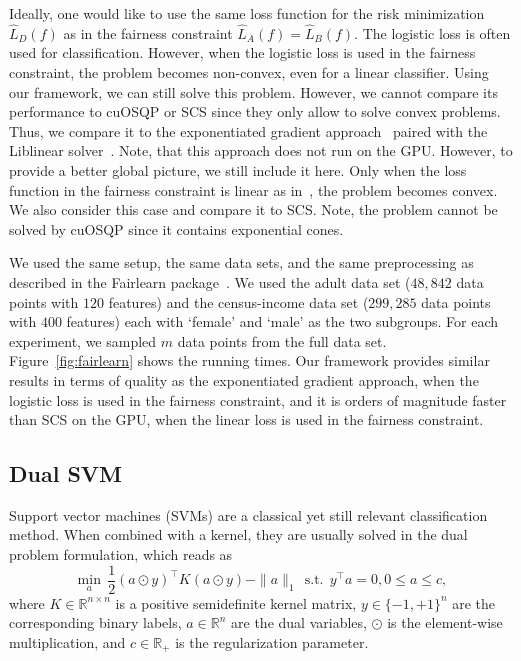 \documentclass[letterpaper]{article} %
\DeclareMathOperator{\st}{s.t.}
\newcommand{\setR}{\mathbb{R}}
\begin{document}
Ideally, one would like to use the same loss function for the risk minimization $\widehat L_D(f)$ as in the fairness constraint $\widehat L_A(f) = \widehat L_B (f)$. The logistic loss is often used for classification. However, when the logistic loss is used in the fairness constraint, the problem becomes non-convex, even for a linear classifier. Using our framework, we can still solve this problem. However, we cannot compare its performance to cuOSQP or SCS since they only allow to solve convex problems. Thus, we compare it to the exponentiated gradient approach~\cite{AgarwalBD0W18} paired with the Liblinear solver~\cite{FanCHWL08}. %
Note, that this approach does not run on the GPU. However, to provide a better global picture, we still include it here. %
Only when the loss function in the fairness constraint is linear as in~\cite{DoniniOBSP18, ZemelWSPD13}, the problem becomes convex. We also consider this case and compare it to SCS. Note, the problem cannot be solved by cuOSQP since it contains exponential cones.

We used the same setup, the same data sets, and the same preprocessing as described in the Fairlearn package~\cite{bird2020fairlearn}. We used the adult data set ($48,842$ data points with $120$ features) and the census-income data set ($299,285$ data points with $400$ features) each with `female' and `male' as the two subgroups. For each experiment, we sampled $m$ data points from the full data set. Figure~\ref{fig:fairlearn} shows the running times. Our framework provides similar results in terms of quality as the exponentiated gradient approach, when the logistic loss is used in the fairness constraint, and it is orders of magnitude faster than SCS on the GPU, when the linear loss is used in the fairness constraint.


\subsection{Dual SVM}

Support vector machines (SVMs) are a classical yet still relevant classification method. When combined with a kernel, they are usually solved in the dual problem formulation, which reads as
\[
\min_{a}\, \frac{1}{2} (a\odot y)^\top K (a\odot y) - \|a\|_1
  \, \st\, y^\top a = 0, 0\leq a\leq c,
\]
where $K\in\setR^{n\times n}$ is a positive semidefinite kernel matrix, $y\in \{-1, +1\}^n$ are the corresponding binary labels, $a\in\setR^n$ are the dual variables, $\odot$ is the element-wise multiplication, and $c\in\setR_+$ is the regularization parameter. %
\end{document}

